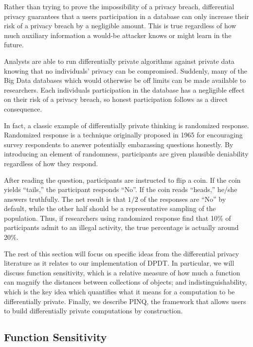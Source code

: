\documentclass[12pt]{article}
\begin{document}
Rather than trying to prove the impossibility of a privacy breach, differential privacy guarantees that a users participation in a database can only increase their risk of a privacy breach by a negligible amount.
This is true regardless of how much auxiliary information a would-be attacker knows or might learn in the future.

Analysts are able to run differentially private algorithms against private data knowing that no individuals' privacy can be compromised.
Suddenly, many of the Big Data databases which would otherwise be off limits can be made available to researchers.
Each individuals participation in the database has a negligible effect on their risk of a privacy breach, so honest participation follows as a direct consequence.

In fact, a classic example of differentially private thinking is randomized response.
Randomized response is a technique originally proposed in 1965 for encouraging survey respondents to answer potentially embarassing questions honestly.
By introducing an element of randomness, participants are given plausible deniability regardless of how they respond.

After reading the question, participants are instructed to flip a coin.
If the coin yields ``tails,'' the participant responds ``No''.
If the coin reads ``heads,'' he/she answers truthfully.
The net result is that $1/2$ of the responses are ``No'' by default, while the other half should be a representative sampling of the population.
Thus, if researchers using randomized response find that 10\% of participants admit to an illegal activity, the true percentage is actually around 20\%.


The rest of this section will focus on specific ideas from the differential privacy literature as it relates to our implementation of DPDT.
In particular, we will discuss function sensitivity, which is a relative measure of how much a function can magnify the distances between collections of objects; and indistinguishability, which is the key idea which quantifies what it means for a computation to be differentially private.
Finally, we describe PINQ, the framework that allows users to build differentially private computations by construction.

\subsection{Function Sensitivity}
\end{document}
